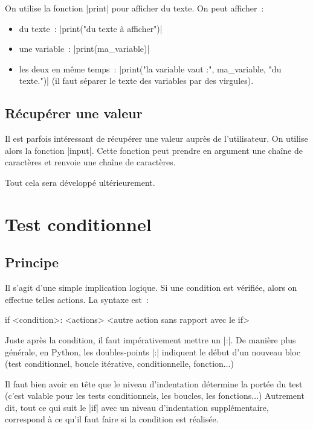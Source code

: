 		On utilise la fonction \python|print| pour afficher du texte. On peut afficher~:
		\begin{itemize}
			\item du texte~: \python|print("du texte à afficher")|
			\item une variable~: \python|print(ma_variable)|
			\item les deux en même temps~: \python|print("la variable vaut :", ma_variable, "du texte.")| (il faut séparer le texte des variables par des virgules).
		\end{itemize}
	
	\subsection{Récupérer une valeur}
		
		Il est parfois intéressant de récupérer une valeur auprès de l'utilisateur. On utilise alors la fonction \python|input|.
		Cette fonction peut prendre en argument une chaîne de caractères et renvoie une chaîne de caractères.
		
		Tout cela sera développé ultérieurement.

\section{Test conditionnel}
	
	\subsection{Principe}
	
		Il s'agit d'une simple implication logique. Si une condition est vérifiée, alors on effectue telles actions.
		La syntaxe est~:
		\begin{pythoncode}
			if <condition>:
				<actions>
			<autre action sans rapport avec le if>
		\end{pythoncode}
		
		Juste après la condition, il faut impérativement mettre un \python|:|. De manière plus générale, en Python, les doubles-points \python|:| indiquent le début d'un nouveau bloc (test conditionnel, boucle itérative, conditionnelle, fonction$\ldots$)
		
		Il faut bien avoir en tête que le niveau d'indentation détermine la portée du test (c'est valable pour les tests conditionnels, les boucles, les fonctions$\ldots$)
		Autrement dit, tout ce qui suit le \python|if| avec un niveau d'indentation supplémentaire, correspond à ce qu'il faut faire si la condition est réalisée.
		
